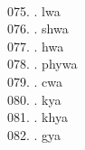 \begin{tabbing}
\egroup  \\
075.	. 	\> lwa 	\> \bgroup\tibetan \def\u#1{\vtop{\baselineskip0pt\hbox{#1}\hbox{\tibsp\char123}}}\parindent=0pt \newbox\fillerbox\setbox\fillerbox\hbox{\vrule height0.4cm depth0.4cm width0pt}\def\filler{\copy\fillerbox} \filler\tibsp{}\tenrm\ \tibetan
\egroup  \\
076.	.	\> shwa	\> \bgroup\tibetan \def\u#1{\vtop{\baselineskip0pt\hbox{#1}\hbox{\tibsp\char123}}}\parindent=0pt \newbox\fillerbox\setbox\fillerbox\hbox{\vrule height0.4cm depth0.4cm width0pt}\def\filler{\copy\fillerbox} \filler\tibsp{}\tenrm\ \tibetan
\egroup  \\
077.	.	\> hwa	\> \bgroup\tibetan \def\u#1{\vtop{\baselineskip0pt\hbox{#1}\hbox{\tibsp\char123}}}\parindent=0pt \newbox\fillerbox\setbox\fillerbox\hbox{\vrule height0.4cm depth0.4cm width0pt}\def\filler{\copy\fillerbox} \filler\tibsp{}\tenrm\ \tibetan
\egroup  \\
078.	.	\> phywa	\> \bgroup\tibetan \def\u#1{\vtop{\baselineskip0pt\hbox{#1}\hbox{\tibsp\char123}}}\parindent=0pt \newbox\fillerbox\setbox\fillerbox\hbox{\vrule height0.4cm depth0.4cm width0pt}\def\filler{\copy\fillerbox} \filler\tibsp{}\tenrm\ \tibetan
\egroup  \\
079.	.	\> cwa		\> \bgroup\tibetan \def\u#1{\vtop{\baselineskip0pt\hbox{#1}\hbox{\tibsp\char123}}}\parindent=0pt \newbox\fillerbox\setbox\fillerbox\hbox{\vrule height0.4cm depth0.4cm width0pt}\def\filler{\copy\fillerbox} \filler\tibsp{}\tenrm\ \tibetan
\egroup  \\
080.	. 	\> kya 	\> \bgroup\tibetan \def\u#1{\vtop{\baselineskip0pt\hbox{#1}\hbox{\tibsp\char123}}}\parindent=0pt \newbox\fillerbox\setbox\fillerbox\hbox{\vrule height0.4cm depth0.4cm width0pt}\def\filler{\copy\fillerbox}\filler\tibsp{}\tenrm\ \tibetan
\egroup  \\
081.	. 	\> khya 	\> \bgroup\tibetan \def\u#1{\vtop{\baselineskip0pt\hbox{#1}\hbox{\tibsp\char123}}}\parindent=0pt \newbox\fillerbox\setbox\fillerbox\hbox{\vrule height0.4cm depth0.4cm width0pt}\def\filler{\copy\fillerbox}\filler\tibsp{}\tenrm\ \tibetan
\egroup  \\
082.	. 	\> gya 	\> \bgroup\tibetan \def\u#1{\vtop{\baselineskip0pt\hbox{#1}\hbox{\tibsp\char123}}}\parindent=0pt \newbox\fillerbox\setbox\fillerbox\hbox{\vrule height0.4cm depth0.4cm width0pt}\def\filler{\copy\fillerbox}\filler\tibsp{}\tenrm\ \tibetan

\end{tabbing}
